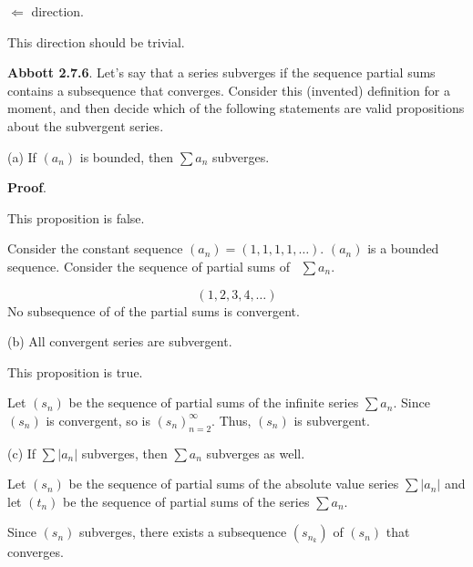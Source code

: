 \documentclass[10pt]{article}
\begin{document}
$ $$\displaystyle \Longleftarrow $ direction.



This direction should be trivial. 



\textbf{Abbott 2.7.6}. Let's say that a series subverges if the sequence partial sums contains a subsequence that converges. Consider this (invented) definition for a moment, and then decide which of the following statements are valid propositions about the subvergent series.



(a) If $\displaystyle ( a_{n})$ is bounded, then $\displaystyle \sum a_{n}$ subverges.



\textbf{Proof}.



This proposition is false.

Consider the constant sequence $\displaystyle ( a_{n}) =( 1,1,1,1,\dotsc )$. $\displaystyle ( a_{n})$ is a bounded sequence. Consider the sequence of partial sums of \ $\displaystyle \sum a_{n}$. 


\begin{equation*}
( 1,2,3,4,\dotsc )
\end{equation*}
No subsequence of of the partial sums is convergent.



(b) All convergent series are subvergent.



This proposition is true. 



Let $\displaystyle ( s_{n})$ be the sequence of partial sums of the infinite series $\displaystyle \sum a_{n}$. Since $\displaystyle ( s_{n})$ is convergent, so is $\displaystyle ( s_{n})_{n=2}^{\infty }$. Thus, $\displaystyle ( s_{n})$ is subvergent.



(c) If $\displaystyle \sum |a_{n} |$ subverges, then $\displaystyle \sum a_{n}$ subverges as well. 



Let $\displaystyle ( s_{n})$ be the sequence of partial sums of the absolute value series $\displaystyle \sum |a_{n} |$ and let $\displaystyle ( t_{n})$ be the sequence of partial sums of the series $\displaystyle \sum a_{n}$. 



Since $\displaystyle ( s_{n})$ subverges, there exists a subsequence $\displaystyle ( s_{n_{k}})$ of $\displaystyle ( s_{n})$ that converges.
\end{document}
